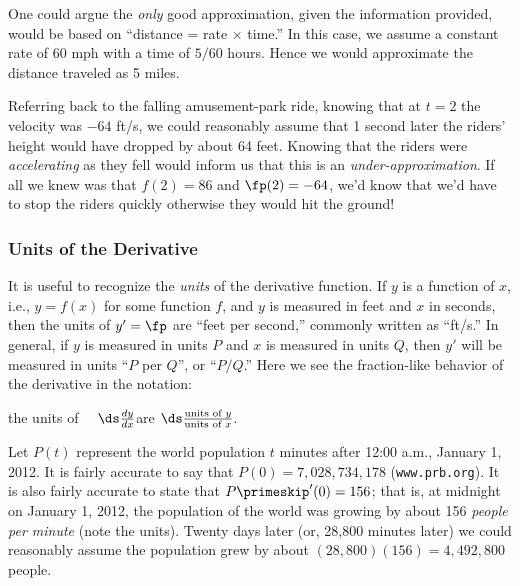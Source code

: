 One could argue the \emph{only} good approximation, given the information provided, would be based on ``distance = rate $\times$ time.'' In this case, we assume a constant rate of 60 mph with a time of $5/60$ hours. Hence we would approximate the distance traveled as 5 miles.\bigskip


Referring back to the falling amusement-park ride, knowing that at $t=2$ the velocity was $-64$ ft/s, we could reasonably assume that 1 second later the riders' height would have dropped by about 64 feet. Knowing that the riders were \emph{accelerating} as they fell would inform us that this is an \emph{under-approximation}. If all we knew was that $f(2) = 86$ and $\fp(2) = -64$, we'd know that we'd have to stop the riders quickly otherwise they would hit the ground!

\subsubsection{Units of the Derivative}

It is useful to recognize the \emph{units} of the derivative function. If $y$ is a function of $x$, i.e., $y=f(x)$ for some function $f$, and $y$ is measured in feet and $x$ in seconds, then the units of $y' = \fp$ are ``feet per second,'' commonly written as ``ft/s.'' In general, if $y$ is measured in units $P$ and $x$ is measured in units $Q$, then $y'$ will be measured in units ``$P$ per $Q$'', or ``$P/Q$.'' Here we see the fraction-like behavior of the derivative in the notation:
	\begin{center}
	the units of $\quad\ds \frac{dy}{dx}$\quad are \quad$\ds \frac{\text{units of $y$}}{\text{units of $x$}}$.
	\end{center}

\begin{example}\label{ex_der_meaning1}
Let $P(t)$ represent the world population $t$ minutes after 12:00 a.m., January 1, 2012. It is fairly accurate to say that $P(0) = 7,028,734,178$ (\texttt{www.prb.org}). It is also fairly accurate to state that $P\primeskip'(0) = 156$; that is, at midnight on January 1, 2012, the population of the world was growing by about 156 \emph{people per minute} (note the units). Twenty days later (or, 28,800 minutes later) we could reasonably assume the population grew by about $(28,800)(156) = 4,492,800$ people.
\end{example}

